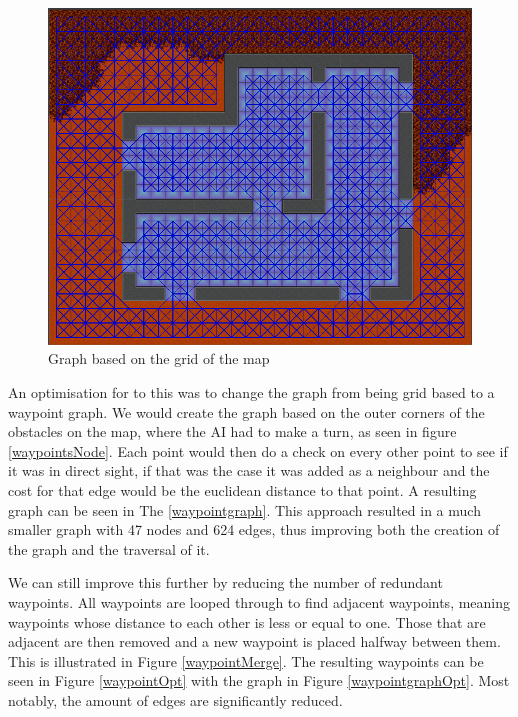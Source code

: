 \begin{figure}[H]
	\includegraphics[width=\textwidth]{figures/astar/gridGraph}
	\caption{Graph based on the grid of the map}
	\label{gridGraph}
\end{figure}

An optimisation for to this was to change the graph from being grid based to a waypoint graph.
We would create the graph based on the outer corners of the obstacles on the map, where the AI had to make a turn, as seen in figure \ref{waypointsNode}.
Each point would then do a check on every other point to see if it was in direct sight, if that was the case it was added as a neighbour and the cost for that edge would be the euclidean distance to that point.
A resulting graph can be seen in The  \ref{waypointgraph}.
This approach resulted in a much smaller graph with 47 nodes and 624 edges, thus improving both the creation of the graph and the traversal of it.

We can still improve this further by reducing the number of redundant waypoints.
All waypoints are looped through to find adjacent waypoints, meaning waypoints whose distance to each other is less or equal to one.
Those that are adjacent are then removed and a new waypoint is placed halfway between them.
This is illustrated in Figure \ref{waypointMerge}.
The resulting waypoints can be seen in Figure \ref{waypointOpt} with the graph in Figure \ref{waypointgraphOpt}.
Most notably, the amount of edges are significantly reduced.


